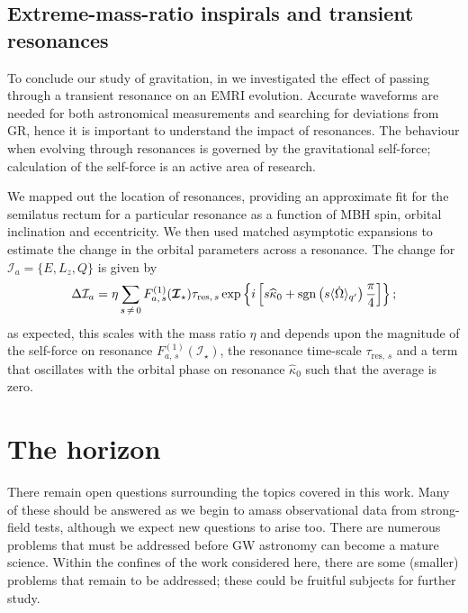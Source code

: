 \subsection{Extreme-mass-ratio inspirals and transient resonances}\label{sec:Review-resonances}

To conclude our study of gravitation, in  we investigated the effect of passing through a transient resonance on an EMRI evolution. Accurate waveforms are needed for both astronomical measurements and searching for deviations from GR, hence it is important to understand the impact of resonances. The behaviour when evolving through resonances is governed by the gravitational self-force; calculation of the self-force is an active area of research.

We mapped out the location of resonances, providing an approximate fit for the semilatus rectum for a particular resonance as a function of MBH spin, orbital inclination and eccentricity. We then used matched asymptotic expansions to estimate the change in the orbital parameters across a resonance. The change for $\mathcal{I}_a = \{E,L_z,Q\}$ is given by
\begin{equation}
\Delta \mathcal{I}_a = \eta\sum_{s\,\neq\,0}F_{a,\,s}^{(1)}(\boldsymbol{\mathcal{I}}_\star)\tau_{\mathrm{res},\,s}\exp\left\{i\left[s \widehat{\kappa}_0 +\operatorname{sgn}\left(s\langle\dot{\Omega}\rangle_{q'}\right)\dfrac{\pi}{4}\right]\right\};
\end{equation}
as expected, this scales with the mass ratio $\eta$ and depends upon the magnitude of the self-force on resonance $F_{a,\,s}^{(1)}(\boldsymbol{\mathcal{I}}_\star)$, the resonance time-scale $\tau_{\mathrm{res},\,s}$ and a term that oscillates with the orbital phase on resonance $\widehat{\kappa}_0$ such that the average is zero.

\section{The horizon}

There remain open questions surrounding the topics covered in this work. Many of these should be answered as we begin to amass observational data from strong-field tests, although we expect new questions to arise too. There are numerous problems that must be addressed before GW astronomy can become a mature science. Within the confines of the work considered here, there are some (smaller) problems that remain to be addressed; these could be fruitful subjects for further study.

